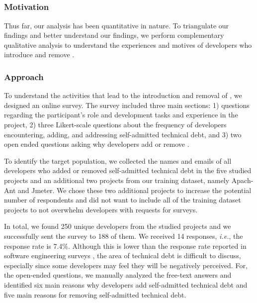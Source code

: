 \subsection*{\rqiv}

\subsubsection*{Motivation} 
Thus far, our analysis has been quantitative in nature. To triangulate our findings and better understand our findings, we perform complementary qualitative analysis to understand the experiences and motives of developers who introduce and remove \SATD.


 
\subsubsection*{Approach} 
To understand the activities that lead to the introduction and removal of \SATD, we designed an online survey. The survey included three main sections: 1)  questions regarding the participant's role and development tasks and experience in the project, 2) three Likert-scale questions about the frequency of developers encountering, adding, and addressing self-admitted technical debt, and 3) two open ended questions asking why developers add or remove \SATD. 

To identify the target population, we collected the names and emails of all developers who added or removed self-admitted technical debt in the five studied projects and an additional two projects from our training dataset, namely Apach-Ant and Jmeter. We chose these two additional projects to increase the potential number of respondents and did not want to include all of the training dataset projects to not overwhelm developers with requests for surveys.

In total, we found 250 unique developers from the studied projects and we successfully sent the survey to 188 of them.  We received 14 responses, \emph{i.e.}, the response rate is 7.4\%. Although this is lower than the response rate reported in software engineering surveys \cite{Punter2003}, the area of technical debt is difficult to discuss, especially since some developers may feel they will be negatively perceived. For, the open-ended questions, we manually analyzed the free-text answers and identified six main reasons why developers add self-admitted technical debt and five main reasons for removing self-admitted technical debt.


